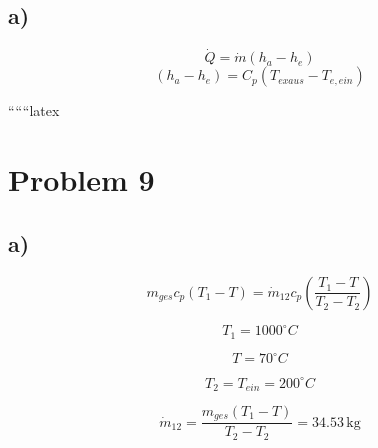 

\subsection*{a)}
\[
\dot{Q} = \dot{m} (h_a - h_e)
\]
\[
(h_a - h_e) = C_p (T_{exaus} - T_{e,ein})
\]

``````latex


\section*{Problem 9}



\subsection*{a)}

\[
m_{ges} c_p (T_1 - T) = \dot{m}_{12} c_p \left( \frac{T_1 - T}{T_2 - T_2} \right)
\]

\[
T_1 = 1000^\circ C
\]

\[
T = 70^\circ C
\]

\[
T_2 = T_{ein} = 200^\circ C
\]

\[
\dot{m}_{12} = \frac{m_{ges} (T_1 - T)}{T_2 - T_2} = 34.53 \, \text{kg}
\]